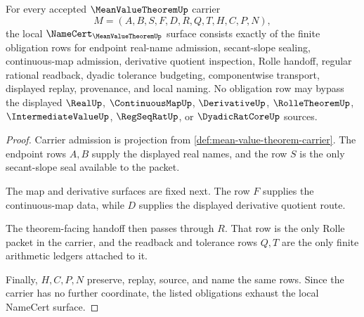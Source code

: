 \begin{theorem}
\label{thm:mean-value-theorem-namecert-obligations}
For every accepted $\MeanValueTheoremUp$ carrier
$$
M=(A,B,S,F,D,R,Q,T,H,C,P,N),
$$
the local $\NameCert_{\MeanValueTheoremUp}$ surface consists exactly of the finite obligation rows for endpoint real-name admission, secant-slope sealing, continuous-map admission, derivative quotient inspection, Rolle handoff, regular rational readback, dyadic tolerance budgeting, componentwise transport, displayed replay, provenance, and local naming. No obligation row may bypass the displayed $\RealUp$, $\ContinuousMapUp$, $\DerivativeUp$, $\RolleTheoremUp$, $\IntermediateValueUp$, $\RegSeqRatUp$, or $\DyadicRatCoreUp$ sources.
\end{theorem}
\begin{proof}
Carrier admission is projection from \autoref{def:mean-value-theorem-carrier}. The endpoint rows $A,B$ supply the displayed real names, and the row $S$ is the only secant-slope seal available to the packet.

The map and derivative surfaces are fixed next. The row $F$ supplies the continuous-map data, while $D$ supplies the displayed derivative quotient route.

The theorem-facing handoff then passes through $R$. That row is the only Rolle packet in the carrier, and the readback and tolerance rows $Q,T$ are the only finite arithmetic ledgers attached to it.

Finally, $H,C,P,N$ preserve, replay, source, and name the same rows. Since the carrier has no further coordinate, the listed obligations exhaust the local NameCert surface.
\end{proof}

